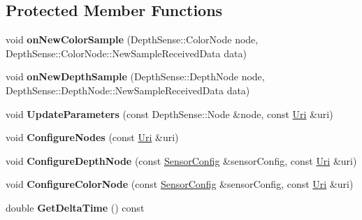 \subsection*{Protected Member Functions}
\begin{DoxyCompactItemize}
\item 
void {\bfseries on\+New\+Color\+Sample} (Depth\+Sense\+::\+Color\+Node node, Depth\+Sense\+::\+Color\+Node\+::\+New\+Sample\+Received\+Data data)\hypertarget{classpangolin_1_1_depth_sense_video_a24bfe1ab3939214135add4274541ea79}{}\label{classpangolin_1_1_depth_sense_video_a24bfe1ab3939214135add4274541ea79}

\item 
void {\bfseries on\+New\+Depth\+Sample} (Depth\+Sense\+::\+Depth\+Node node, Depth\+Sense\+::\+Depth\+Node\+::\+New\+Sample\+Received\+Data data)\hypertarget{classpangolin_1_1_depth_sense_video_ac37f0399edc6d0610f1726dbcbda48c5}{}\label{classpangolin_1_1_depth_sense_video_ac37f0399edc6d0610f1726dbcbda48c5}

\item 
void {\bfseries Update\+Parameters} (const Depth\+Sense\+::\+Node \&node, const \hyperlink{classpangolin_1_1_uri}{Uri} \&uri)\hypertarget{classpangolin_1_1_depth_sense_video_a107e0f5e9fb28d5c1b178b39c2aeb0fb}{}\label{classpangolin_1_1_depth_sense_video_a107e0f5e9fb28d5c1b178b39c2aeb0fb}

\item 
void {\bfseries Configure\+Nodes} (const \hyperlink{classpangolin_1_1_uri}{Uri} \&uri)\hypertarget{classpangolin_1_1_depth_sense_video_a1670e4ccc178a7fe55093c3bd9f9aee6}{}\label{classpangolin_1_1_depth_sense_video_a1670e4ccc178a7fe55093c3bd9f9aee6}

\item 
void {\bfseries Configure\+Depth\+Node} (const \hyperlink{structpangolin_1_1_depth_sense_video_1_1_sensor_config}{Sensor\+Config} \&sensor\+Config, const \hyperlink{classpangolin_1_1_uri}{Uri} \&uri)\hypertarget{classpangolin_1_1_depth_sense_video_add62506c40b128168e1089c5ecf8a85f}{}\label{classpangolin_1_1_depth_sense_video_add62506c40b128168e1089c5ecf8a85f}

\item 
void {\bfseries Configure\+Color\+Node} (const \hyperlink{structpangolin_1_1_depth_sense_video_1_1_sensor_config}{Sensor\+Config} \&sensor\+Config, const \hyperlink{classpangolin_1_1_uri}{Uri} \&uri)\hypertarget{classpangolin_1_1_depth_sense_video_a4dd87d108c5fa2d40e6965d0a65d1dd1}{}\label{classpangolin_1_1_depth_sense_video_a4dd87d108c5fa2d40e6965d0a65d1dd1}

\item 
double {\bfseries Get\+Delta\+Time} () const \hypertarget{classpangolin_1_1_depth_sense_video_ad260582fdb507186d2275d21819ebfba}{}\label{classpangolin_1_1_depth_sense_video_ad260582fdb507186d2275d21819ebfba}

\end{DoxyCompactItemize}
